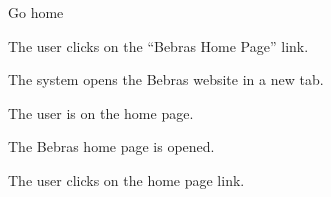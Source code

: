 
\begin{uc}{Go home}

    \begin{uc-mss}
    \item The user clicks on the ``Bebras Home Page'' link.
    \item The system opens the Bebras website in a new tab.
    \end{uc-mss}

    \begin{uc-pre}
    \item The user is on the home page.
    \end{uc-pre}

    \begin{uc-post}
    \item The Bebras home page is opened.
    \end{uc-post}

    \begin{uc-trig}
        The user clicks on the home page link.
    \end{uc-trig}

\end{uc}

